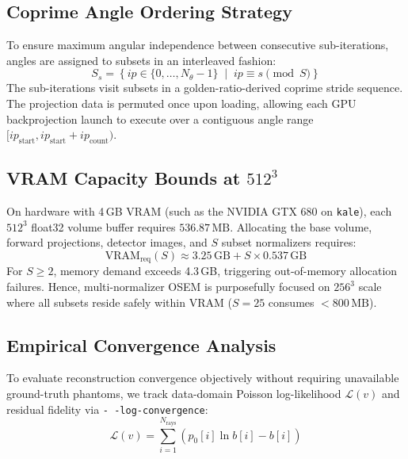 \documentclass[11pt,a4paper]{article}
\begin{document}
\subsection{Coprime Angle Ordering Strategy}
To ensure maximum angular independence between consecutive sub-iterations, angles are assigned to subsets in an interleaved fashion:
\begin{equation}
    S_s = \left\{ ip \in \{0, \dots, N_\theta-1\} \;\middle|\; ip \equiv s \pmod S \right\}
\end{equation}
The sub-iterations visit subsets in a golden-ratio-derived coprime stride sequence. The projection data is permuted once upon loading, allowing each GPU backprojection launch to execute over a contiguous angle range $[ip_{\text{start}}, ip_{\text{start}} + ip_{\text{count}})$.

\subsection{VRAM Capacity Bounds at $512^3$}
On hardware with 4\,GB VRAM (such as the NVIDIA GTX 680 on \texttt{kale}), each $512^3$ float32 volume buffer requires $536.87\,\text{MB}$. Allocating the base volume, forward projections, detector images, and $S$ subset normalizers requires:
\begin{equation}
    \text{VRAM}_{\text{req}}(S) \approx 3.25\,\text{GB} + S \times 0.537\,\text{GB}
\end{equation}
For $S \ge 2$, memory demand exceeds 4.3\,GB, triggering out-of-memory allocation failures. Hence, multi-normalizer OSEM is purposefully focused on $256^3$ scale where all subsets reside safely within VRAM ($S=25$ consumes $<800\,\text{MB}$).

\subsection{Empirical Convergence Analysis}
To evaluate reconstruction convergence objectively without requiring unavailable ground-truth phantoms, we track data-domain Poisson log-likelihood $\mathcal{L}(v)$ and residual fidelity via \texttt{-\,-log-convergence}:
\begin{equation}
    \mathcal{L}(v) = \sum_{i=1}^{N_{\text{rays}}} \left( p_0[i] \ln b[i] - b[i] \right)
\end{equation}
\end{document}
